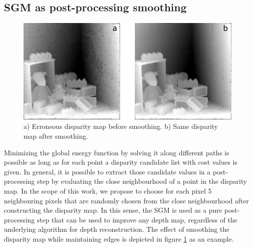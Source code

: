 \documentclass  [
  paper    = a4,
  BCOR     = 10mm,
  twoside,
  fontsize = 12pt,
  fleqn,
  toc      = bibnumbered,
  toc      = listofnumbered,
  numbers  = noendperiod,
  headings = normal,
  listof   = leveldown,
  version  = 3.03
]                                       {scrreprt}
\begin{document}
\subsection{SGM as post-processing smoothing}
\label{sec:postprocessing_smoothing}
\begin{figure}[h!]
	\centering
	\includegraphics[width=1\linewidth]{images/sgm_ppr_example}
	\caption[Example for post-processing smoothing]{a) Erroneous disparity map before smoothing. b) Same disparity map after smoothing.}
	\label{fig:sgmpprexample}
\end{figure}
Minimizing the global energy function by solving it along different paths is possible as long as for each point a disparity candidate list with cost values is given. In general, it is possible to extract those candidate values in a post-processing step by evaluating the close neighbourhood of a point in the disparity map. In the scope of this work, we propose to choose for each pixel 5 neighbouring pixels that are randomly chosen from the close neighbourhood after constructing the disparity map. In this sense, the SGM is used as a pure post-processing step that can be used to improve any depth map, regardless of the underlying algorithm for depth reconstruction. The effect of smoothing the disparity map while maintaining edges is depicted in figure \ref{fig:sgmpprexample} as an example.
\end{document}
